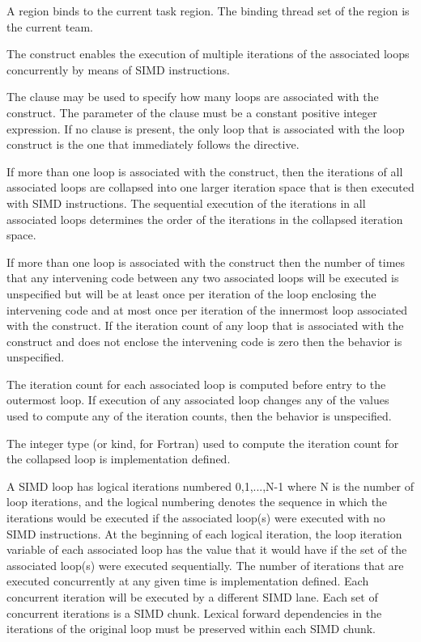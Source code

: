 \binding
A  region binds to the current task region. The binding thread set of the 
region is the current team.

\descr
The  construct enables the execution of multiple iterations of the associated loops
concurrently by means of SIMD instructions.

The  clause may be used to specify how many loops are associated with the
construct. The parameter of the  clause must be a constant positive integer
expression. If no  clause is present, the only loop that is associated with the
loop construct is the one that immediately follows the directive.

If more than one loop is associated with the  construct, then the iterations of all
associated loops are collapsed into one larger iteration space that is then executed with
SIMD instructions. The sequential execution of the iterations in all associated loops
determines the order of the iterations in the collapsed iteration space.

If more than one loop is associated with the  construct
then the number of times that any intervening code between any two
associated loops will be executed is unspecified but will be at least
once per iteration of the loop enclosing the intervening code and at
most once per iteration of the innermost loop associated with the
construct.  If the iteration count of any loop that is associated with the 
construct and does not enclose the intervening code is zero then the behavior
is unspecified.


The iteration count for each associated loop is computed before entry to the outermost
loop. If execution of any associated loop changes any of the values used to compute any
of the iteration counts, then the behavior is unspecified.

The integer type (or kind, for Fortran) used to compute the iteration count for the
collapsed loop is implementation defined.

A SIMD loop has logical iterations numbered 0,1,...,N-1 where N is the
number of loop iterations, and the logical numbering denotes the
sequence in which the iterations would be executed if the associated
loop(s) were executed with no SIMD instructions.  At the beginning of
each logical iteration, the loop iteration variable of each associated
loop has the value that it would have if the set of the associated
loop(s) were executed sequentially. The number of iterations that are
executed concurrently at any given time is implementation defined.
Each concurrent iteration will be executed by a different SIMD lane.
Each set of concurrent iterations is a SIMD chunk.  Lexical forward
dependencies in the iterations of the original loop must be preserved
within each SIMD chunk.


